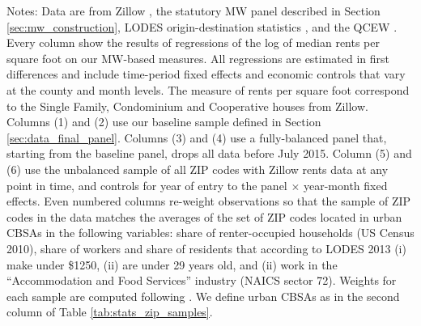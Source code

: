 \begin{landscape}
\begin{table}[hbt!]
    \begin{minipage}{.95\linewidth} \footnotesize
        \vspace{2mm}
        Notes:
        Data are from Zillow \parencite{ZillowData}, 
        the statutory MW panel described in Section \ref{sec:mw_construction}, 
        LODES origin-destination statistics \parencite{CensusLODES},
        and the QCEW \parencite{QCEW}.
        Every column show the results of regressions of the log of 
        median rents per square foot on our MW-based measures.
        All regressions are estimated in first differences and include 
        time-period fixed effects and economic controls that vary at the 
        county and month levels.
        The measure of rents per square foot correspond to the Single Family, 
        Condominium and Cooperative houses from Zillow.
        Columns (1) and (2) use our baseline sample defined in Section 
        \ref{sec:data_final_panel}.
        Columns (3) and (4) use a fully-balanced panel that, starting from the 
        baseline panel, drops all data before July 2015.
        Column (5) and (6) use the unbalanced sample of all ZIP codes with 
        Zillow rents data at any point in time, and controls for year of entry 
        to the panel $\times$ year-month fixed effects.
        Even numbered columns re-weight observations so that the sample of 
        ZIP codes in the data matches the averages of the set of ZIP codes
        located in urban CBSAs in the following variables:
        share of renter-occupied households (US Census 2010),
        share of workers and share of residents that according to LODES 2013 
        (i) make under \$1250, (ii) are under 29 years old, and (ii) work in 
        the ``Accommodation and Food Services'' industry (NAICS sector 72). 
        Weights for each sample are computed following \textcite{Hainmueller2012}.
        We define urban CBSAs as in the second column of Table 
        \ref{tab:stats_zip_samples}.
    \end{minipage}
\end{table}
\end{landscape}
